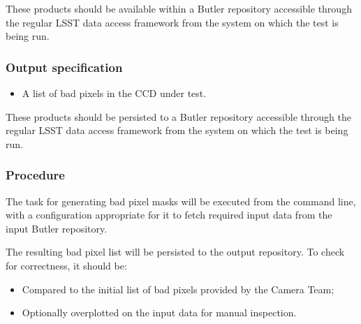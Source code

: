These products should be available within a Butler repository accessible
through the regular LSST data access framework from the system on which the test
is being run.

\subsubsection{Output specification}

\begin{itemize}

  \item{A list of bad pixels in the CCD under test.}

\end{itemize}

These products should be persisted to a Butler repository accessible through
the regular LSST data access framework from the system on which the test is
being run.

\subsubsection{Procedure}

The task for generating bad pixel masks will be executed from the command line,
with a configuration appropriate for it to fetch required input data from the
input Butler repository.

The resulting bad pixel list will be persisted to the output repository. To
check for correctness, it should be:

\begin{itemize}

  \item{Compared to the initial list of bad pixels provided by the Camera Team;}
  \item{Optionally overplotted on the input data for manual inspection.}

\end{itemize}
